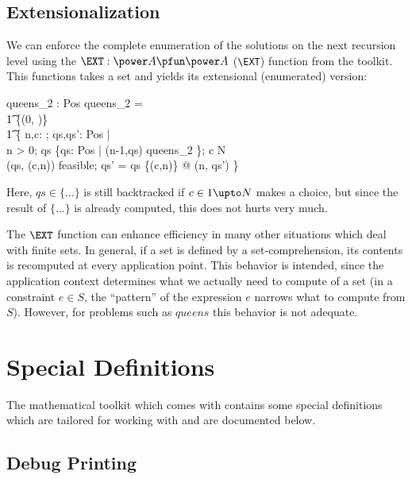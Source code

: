 \documentclass{article}
\begin{document}
\subsection{Extensionalization}

We can enforce the complete enumeration of the solutions on the
next recursion level using the $\EXT: \power A \pfun \power A$
(\verb:\EXT:) function from the toolkit. This functions takes
a set and yields its extensional (enumerated) version:

\begin{axdef}
  queens_2 : \nat \rel \power Pos
\where
  queens_2 = \\\t1
    \{(0, \emptyset)\} \cup \\ \t1
    \{\<
      n,c: \nat; qs,qs': \power Pos | \\
      n > 0;
      qs \in \EXT \{qs: \power Pos | (n-1,qs) \in queens_2 \};
      c  \upto N \\
      (qs, (c,n)) \in feasible; 
      qs' = qs \cup \{(c,n)\}
       @ 
      (n, qs') \} \>
\end{axdef}

Here, $qs \in \{\ldots\}$ is still backtracked if $c \in 1 \upto N$ makes
a choice, but since the result of $\{\ldots\}$ is already computed, this
does not hurts very much.

The $\EXT$ function can enhance efficiency in many other situations
which deal with finite sets. In general, if a set is defined
by a set-comprehension, its contents is recomputed at every
application point. This behavior is intended, since 
the application context determines what we actually
need to compute of a set (in a constraint $e \in S$, the
``pattern'' of the expression $e$ narrows what 
to compute from $S$). However, for problems such as $queens$
this behavior is not adequate.


\section{Special Definitions}


The mathematical toolkit which comes with \Zeta{} contains
some special definitions which are tailored for working with \ZAP{}
and are documented below.

\subsection{Debug Printing}
\end{document}
